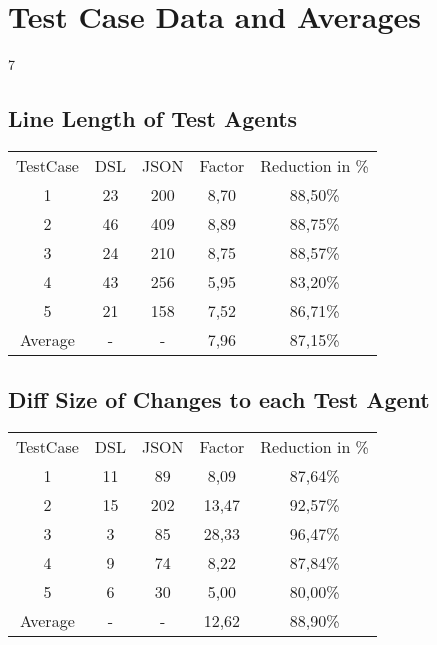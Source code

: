 \chapter{Test Case Data and Averages}7
\label{ResultTables}
\section{Line Length of Test Agents}
\begin{tabular}{ccccc}
    TestCase & DSL & JSON & Factor & Reduction in \% \\
    1 & 23 & 200 & 8,70 & 88,50\% \\
    2 & 46 & 409 & 8,89 & 88,75\% \\
    3 & 24 & 210 & 8,75 & 88,57\% \\
    4 & 43 & 256 & 5,95 & 83,20\% \\
    5 & 21 & 158 & 7,52 & 86,71\% \\
    Average & - & - & 7,96 & 87,15\% \\
\end{tabular}
    

\section{Diff Size of Changes to each Test Agent}
\begin{tabular}{ccccc}
    TestCase & DSL & JSON & Factor & Reduction in \% \\
    1 & 11 & 89 & 8,09 & 87,64\% \\
    2 & 15 & 202 & 13,47 & 92,57\% \\
    3 & 3 & 85 & 28,33 & 96,47\% \\
    4 & 9 & 74 & 8,22 & 87,84\% \\
    5 & 6 & 30 & 5,00 & 80,00\% \\
    Average & - & - & 12,62 & 88,90\% \\
\end{tabular}